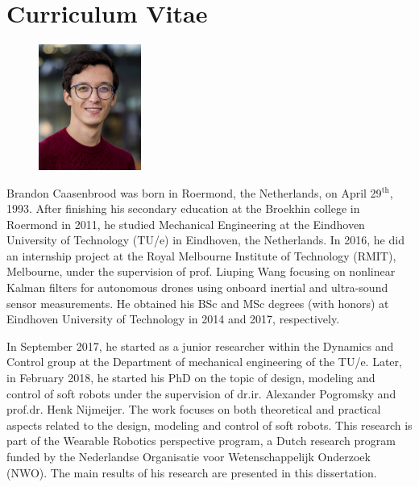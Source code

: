 \chapter*{Curriculum Vitae}
\vspace{-5mm}

\begin{figure}
\centering
\vspace{-4mm}
\includegraphics[width=0.3\textwidth]{./fig/Brandon.png}
\vspace{-9mm}
\end{figure}
Brandon Caasenbrood was born in Roermond, the Netherlands, on April 29$^{\textrm{th}}$, 1993. After finishing his secondary education at the Broekhin college in Roermond in 2011, he studied Mechanical Engineering at the Eindhoven University of Technology (TU/e) in Eindhoven, the Netherlands. In 2016, he did an internship project at the Royal Melbourne Institute of Technology (RMIT), Melbourne, under the supervision of prof. Liuping Wang focusing on nonlinear Kalman filters for autonomous drones using onboard inertial and ultra-sound sensor measurements. He obtained his BSc and MSc degrees (with honors) at Eindhoven University of Technology in 2014 and 2017, respectively. 

In September 2017, he started as a junior researcher within the Dynamics and Control group at the Department of mechanical engineering of the TU/e. Later, in February 2018, he started his PhD on the topic of design, modeling and control of soft robots under the supervision of dr.ir. Alexander Pogromsky and prof.dr. Henk Nijmeijer. The work focuses on both theoretical and practical aspects related to the design, modeling and control of soft robots. This research is part of the Wearable Robotics perspective program, a Dutch research program funded by the Nederlandse Organisatie voor Wetenschappelijk Onderzoek (NWO). The main results of his research are presented in this dissertation.
